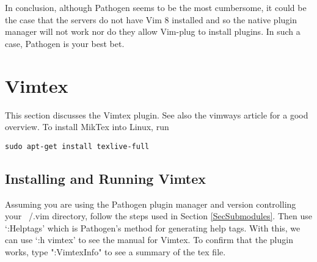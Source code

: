In conclusion, although Pathogen seems to be the most cumbersome, it could be
the case that the servers do not have Vim 8 installed and so the native plugin
manager will not work nor do they allow Vim-plug to install plugins. In such a
case, Pathogen is your best bet.

\section{Vimtex}
This section discusses the Vimtex \cite{lervag2015vim} plugin. See also the
vimways article \cite{woodruff2019latex} for a good overview.  To install MikTex
into Linux, run
\begin{lstlisting}
sudo apt-get install texlive-full
\end{lstlisting}

\subsection{Installing and Running Vimtex}
Assuming you are using the Pathogen plugin manager and version controlling your
~/.vim directory, follow the steps used in Section \ref{SecSubmodules}. Then use
`:Helptags' which is Pathogen's method for generating help tags. With this, we
can use `:h vimtex' to see the manual for Vimtex. To confirm that the plugin
works, type ":VimtexInfo" to see a summary of the tex file.
